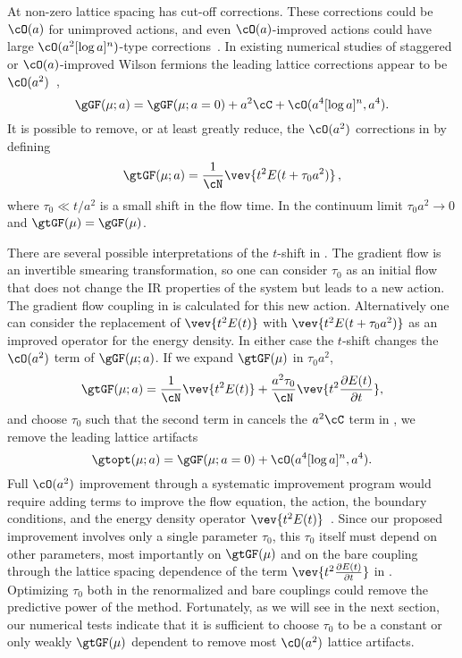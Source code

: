 At non-zero lattice spacing \gGF has cut-off corrections.
These corrections could be $\cO(a)$ for unimproved actions, and even $\cO(a)$-improved actions could have large $\cO(a^2 [\log a]^n)$-type corrections~\cite{Balog:2009yj, Balog:2009np}.
In existing numerical studies of staggered or $\cO(a)$-improved Wilson fermions the leading lattice corrections appear to be $\cO(a^2)$~\cite{Fritzsch:2013je, Sommer:2014mea},
\begin{equation}
  \label{eq:lat_g2}
  \gGF(\mu; a) = \gGF(\mu; a = 0) + a^2 \cC + \cO(a^4 [\log a]^n, a^4).
\end{equation}
It is possible to remove, or at least greatly reduce, the $\cO(a^2)$ corrections in  by defining
\begin{equation}
  \label{eq:t-shift}
  \gtGF(\mu; a) = \frac{1}{\cN} \vev{t^2 E(t + \tau_0 a^2)}\, ,
\end{equation}
where $\tau_0 \ll t / a^2$ is a small shift in the flow time.
In the continuum limit $\tau_0 a^2 \to 0$ and $\gtGF(\mu) = \gGF(\mu)$.

There are several possible interpretations of the $t$-shift in .
The gradient flow is an invertible smearing transformation, so one can consider $\tau_0$ as an initial flow that does not change the IR properties of the system but leads to a new action.
The gradient flow coupling \gtGF in  is calculated for this new action.
Alternatively one can consider the replacement of $\vev{t^2 E(t)}$ with $\vev{t^2 E(t + \tau_0 a^2)}$ as an improved operator for the energy density.
In either case the $t$-shift changes the $\cO(a^2)$ term of $\gGF(\mu; a)$.
If we expand $\gtGF(\mu)$ in $\tau_0 a^2$,
\begin{equation}
  \label{eq:expand}
  \gtGF(\mu; a) = \frac{1}{\cN} \vev{t^2 E(t)} + \frac{a^2 \tau_0}{\cN} \vev{t^2 \frac{\partial E(t)}{\partial t}},
\end{equation}
and choose $\tau_0$ such that the second term in  cancels the $a^2 \cC$ term in , we remove the leading lattice artifacts
\begin{equation}
  \gtopt(\mu; a) = \gGF(\mu; a = 0) + \cO(a^4 [\log a]^n, a^4).
\end{equation}
Full $\cO(a^2)$ improvement through a systematic improvement program would require adding terms to improve the flow equation, the action, the boundary conditions, and the energy density operator $\vev{t^2 E(t)}$~\cite{Sommer:2014mea}.
Since our proposed improvement involves only a single parameter $\tau_0$, this $\tau_0$ itself must depend on other parameters, most importantly on $\gtGF(\mu)$ and on the bare coupling through the lattice spacing dependence of the term $\vev{t^2 \frac{\partial E(t)}{\partial t}}$ in .
Optimizing $\tau_0$ both in the renormalized and bare couplings could remove the predictive power of the method.
Fortunately, as we will see in the next section, our numerical tests indicate that it is sufficient to choose $\tau_0$ to be a constant or only weakly $\gtGF(\mu)$ dependent to remove most $\cO(a^2)$ lattice artifacts.

